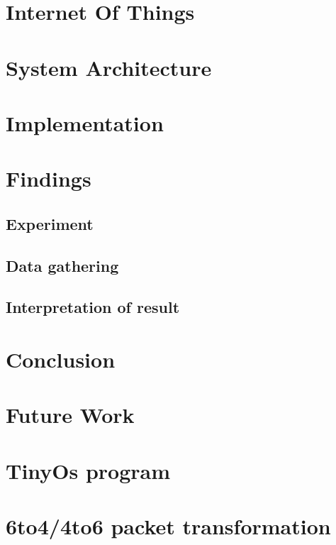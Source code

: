 \documentclass[oneside,12pt,a4paper,final]{book}
\begin{document}
\chapter{Internet Of Things}


\chapter{System Architecture}

\chapter{Implementation}


\chapter{Findings}
\section{Experiment}
\section{Data gathering}
\section{Interpretation of result}

\chapter{Conclusion}

\chapter{Future Work}

\appendix
\chapter{TinyOs program}
\chapter{6to4/4to6 packet transformation}

\backmatter
\mbox{}
\nocite{*}
 

\newpage
\listoffigures
\end{document}
